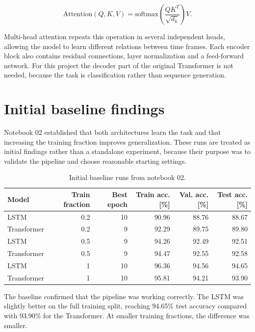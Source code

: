 \documentclass[14pt]{article}
\begin{document}
\begin{equation}
    \text{Attention}(Q,K,V) = \text{softmax}\left(\frac{QK^T}{\sqrt{d_k}}\right)V.
\end{equation}

Multi-head attention repeats this operation in several independent heads, allowing the model to learn different relations between time frames. Each encoder block also contains residual connections, layer normalization and a feed-forward network. For this project the decoder part of the original Transformer is not needed, because the task is classification rather than sequence generation.

\section{Initial baseline findings}

Notebook 02 established that both architectures learn the task and that increasing the training fraction improves generalization. These runs are treated as initial findings rather than a standalone experiment, because their purpose was to validate the pipeline and choose reasonable starting settings.

\begin{table}[H]
\centering
\caption{Initial baseline runs from notebook 02.}
\label{tab:baseline}
\begin{tabular}{lrrrrr}
\toprule
Model & Train fraction & Best epoch & Train acc. [\%] & Val. acc. [\%] & Test acc. [\%] \\
\midrule
LSTM & 0.2 & 10 & 90.96 & 88.76 & 88.67 \\
Transformer & 0.2 & 9 & 92.29 & 89.75 & 89.80 \\
LSTM & 0.5 & 9 & 94.26 & 92.49 & 92.51 \\
Transformer & 0.5 & 9 & 94.47 & 92.55 & 92.58 \\
LSTM & 1 & 10 & 96.36 & 94.56 & 94.65 \\
Transformer & 1 & 10 & 95.81 & 94.21 & 93.90 \\
\bottomrule
\end{tabular}
\end{table}

The baseline confirmed that the pipeline was working correctly. The LSTM was slightly better on the full training split, reaching 94.65\% test accuracy compared with 93.90\% for the Transformer. At smaller training fractions, the difference was smaller.
\end{document}
